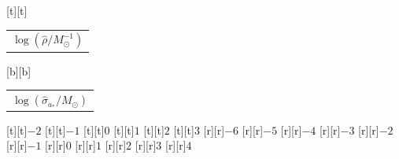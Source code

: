 %    
%
%
\begin{psfrags}%
\psfragscanon%
%
[t][t]{\color[rgb]{0,0,0}\setlength{\tabcolsep}{0pt}\begin{tabular}{c}{\Large$\log\left(\hat{\rho}/M_\odot^{-1}\right)$}\end{tabular}}%
[b][b]{\color[rgb]{0,0,0}\setlength{\tabcolsep}{0pt}\begin{tabular}{c}{\Large$\log\left(\hat{\sigma}_{a_\ast}/M_\odot\right)$}\end{tabular}}%
%
[t][t]{$-2$}%
[t][t]{$-1$}%
[t][t]{$0$}%
[t][t]{$1$}%
[t][t]{$2$}%
[t][t]{$3$}%
%
[r][r]{$-6$}%
[r][r]{$-5$}%
[r][r]{$-4$}%
[r][r]{$-3$}%
[r][r]{$-2$}%
[r][r]{$-1$}%
[r][r]{$0$}%
[r][r]{$1$}%
[r][r]{$2$}%
[r][r]{$3$}%
[r][r]{$4$}%
%
%
\end{psfrags}%
%
